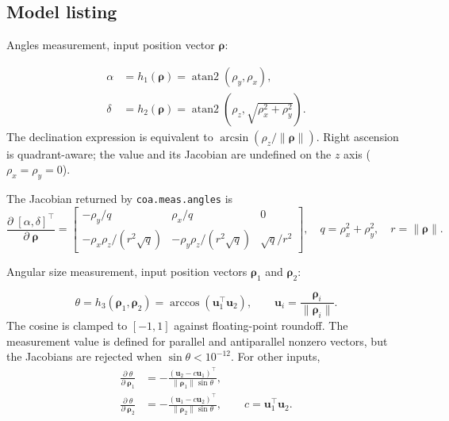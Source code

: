 \documentclass[]{article}
\newcommand{\pd}[2]{\frac{\partial\;#1}{\partial\;#2}}
\begin{document}
\subsection{Model listing}

Angles measurement, input position vector $\boldsymbol{\rho}$:

\begin{align}
  \alpha &= h_1(\boldsymbol{\rho})
          = \operatorname{atan2}(\rho_y,\rho_x), \\
  \delta &= h_2(\boldsymbol{\rho})
          = \operatorname{atan2}\!\left(\rho_z,
              \sqrt{\rho_x^2+\rho_y^2}\right).
  \label{eq:measurement-angles}
\end{align}
The declination expression is equivalent to
$\arcsin(\rho_z/\|\boldsymbol{\rho}\|)$. Right ascension is quadrant-aware;
the value and its Jacobian are undefined on the $z$ axis
($\rho_x=\rho_y=0$).

The Jacobian returned by \texttt{coa.meas.angles} is
\begin{equation}
  \pd{[\alpha,\delta]^\top}{\boldsymbol{\rho}} =
  \begin{bmatrix}
    -\rho_y/q & \rho_x/q & 0 \\
    -\rho_x\rho_z/(r^2\sqrt{q}) &
    -\rho_y\rho_z/(r^2\sqrt{q}) & \sqrt{q}/r^2
  \end{bmatrix},\quad
  q=\rho_x^2+\rho_y^2,\quad r=\|\boldsymbol{\rho}\|.
\end{equation}

Angular size measurement, input position vectors $\boldsymbol{\rho}_1$ and
$\boldsymbol{\rho}_2$:

\begin{equation}
  \theta = h_3(\boldsymbol{\rho}_1,\boldsymbol{\rho}_2)
  = \arccos(\mathbf{u}_1^\top\mathbf{u}_2),\qquad
  \mathbf{u}_i=\frac{\boldsymbol{\rho}_i}{\|\boldsymbol{\rho}_i\|}.
  \label{eq:measurement-angular-size}
\end{equation}
The cosine is clamped to $[-1,1]$ against floating-point roundoff. The
measurement value is defined for parallel and antiparallel nonzero vectors,
but the Jacobians are rejected when $\sin\theta<10^{-12}$. For other inputs,
\begin{align}
  \pd{\theta}{\boldsymbol{\rho}_1}
    &= -\frac{(\mathbf{u}_2-c\mathbf{u}_1)^\top}
             {\|\boldsymbol{\rho}_1\|\sin\theta}, \\
  \pd{\theta}{\boldsymbol{\rho}_2}
    &= -\frac{(\mathbf{u}_1-c\mathbf{u}_2)^\top}
             {\|\boldsymbol{\rho}_2\|\sin\theta},\qquad
  c=\mathbf{u}_1^\top\mathbf{u}_2.
\end{align}
\end{document}
